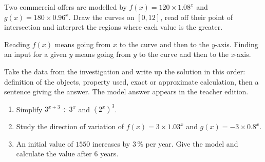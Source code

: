 \begin{activite}
Two commercial offers are modelled by $f(x)=120\times1.08^x$ and $g(x)=180\times0.96^x$. Draw the curves on $[0,12]$, read off their point of intersection and interpret the regions where each value is the greater.
\begin{center}\end{center}
\end{activite}

\begin{traceecrite}Reading $f(x)$ means going from $x$ to the curve and then to the \textit{y}-axis. Finding an input for a given $y$ means going from $y$ to the curve and then to the \textit{x}-axis.\end{traceecrite}

\begin{exemple}
Take the data from the investigation and write up the solution in this order: definition of the objects, property used, exact or approximate calculation, then a sentence giving the answer. The model answer appears in the teacher edition.
\end{exemple}

\begin{exercice}[-- essential]
\begin{enumerate}\item Simplify $3^{x+3}\div3^x$ and $(2^x)^3$.\item Study the direction of variation of $f(x)=3\times1.03^x$ and $g(x)=-3\times0.8^x$.\item An initial value of $1550$ increases by $3\,\%$ per year. Give the model and calculate the value after $6$ years.\end{enumerate}
\end{exercice}

